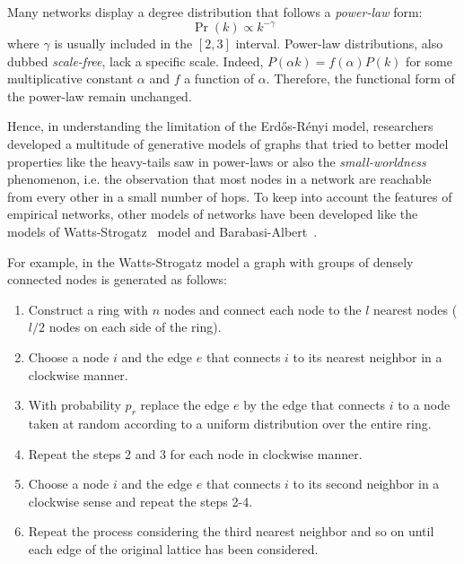 \documentclass[11pt,              a4paper,              twoside,openright,              titlepage,              headinclude,footinclude,                            numbers=noenddot,              cleardoublepage=empty,]{scrreprt}
\begin{document}
Many networks display a degree distribution that follows a \emph{power-law} form:
\begin{equation}
\Pr(k) \propto k^{-\gamma}
\end{equation}
where $\gamma$ is usually included in the $[2,3]$ interval.
Power-law distributions, also dubbed \emph{scale-free}, lack a specific scale.
Indeed, $P(\alpha k)=f(\alpha)P(k)$ for some multiplicative constant $\alpha$  and $f$ a function of $\alpha$.
Therefore, the functional form of the power-law remain unchanged.

Hence, in understanding the limitation of the Erd\H{o}s-Rényi model, researchers developed a multitude of generative models of graphs that tried to better model properties like the heavy-tails saw in power-laws or also the \emph{small-worldness} phenomenon, i.e.
the observation that most nodes in a network are reachable from every other in a small number of hops.
To keep into account the features of empirical networks, other models of networks have been developed like the models of Watts-Strogatz~\cite{watts1998} model and Barabasi-Albert~\cite{barabasi1999}.

For example, in the Watts-Strogatz model a graph with groups of densely connected nodes is generated as follows:
\begin{enumerate}
\item Construct a ring with $n$ nodes and connect each node to the $l$ nearest nodes ($l/2$ nodes on each side of the ring).
\item Choose a node $i$ and the edge $e$ that connects $i$ to its nearest neighbor in a clockwise manner.
\item With probability $p_r$ replace the edge $e$ by the edge that connects $i$ to a node taken at random according to a uniform distribution over the entire ring.
\item Repeat the steps 2 and 3 for each node in clockwise manner.
\item Choose a node $i$ and the edge $e$ that connects $i$ to its second neighbor in a clockwise sense and repeat the steps 2-4.
\item Repeat the process considering the third nearest neighbor and so on until each edge of the original lattice has been considered.
\end{enumerate}
\end{document}
